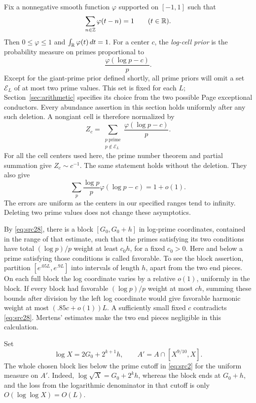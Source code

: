 Fix a nonnegative smooth function $\varphi$ supported on $[-1,1]$
such that
\[
 \sum_{n\in\mathbb Z}\varphi(t-n)=1\qquad(t\in\mathbb R).
\]
Then $0\le\varphi\le1$ and $\int_{\mathbb R}\varphi(t)\,dt=1$.
For a center $c$, the \emph{log-cell prior} is the probability measure
on primes proportional to
\[
                 \frac{\varphi(\log p-c)}p.
\]
Except for the giant-prime prior defined shortly, all prime priors
will omit a set $\mathcal E_L$ of at most two prime values.  This set
is fixed for each $L$; Section~\ref{sec:arithmetic} specifies its
choice from the two possible Page exceptional conductors.  Every
abundance assertion in this section holds uniformly after any such
deletion.  A nongiant cell is therefore normalized by
\[
 Z_c=\sum_{\substack{p\ \text{prime}\\p\notin\mathcal E_L}}
                 \frac{\varphi(\log p-c)}p.
\]
For all the cell centers used here, the prime number theorem and
partial summation give $Z_c\sim c^{-1}$.  The same statement holds
without the deletion.  They also give
\[
 \sum_p\frac{\log p}{p}\varphi(\log p-c)=1+o(1).
\]
The errors are uniform as the centers in our specified ranges tend
to infinity.  Deleting two prime values does not change these
asymptotics.

By \eqref{eq:src28}, there is a block $[G_0,G_0+h]$ in log-prime
coordinates, contained in the range of that estimate, such that the
primes satisfying its two conditions have total $(\log p)/p$ weight
at least $c_0h$, for a fixed $c_0>0$.  Here and below a prime satisfying
those conditions is called favorable.  To see the block assertion,
partition
$[e^{.05L},e^{.9L}]$ into intervals of length $h$, apart from the two
end pieces.  On each full block the log coordinate varies by a
relative $o(1)$, uniformly in the block.  If every block had favorable
$(\log p)/p$ weight at most $ch$, summing these bounds after division
by the left log coordinate would give favorable harmonic weight at
most $(.85c+o(1))L$.  A sufficiently small fixed $c$ contradicts
\eqref{eq:src28}.  Mertens' estimates make the two end pieces
negligible in this calculation.

Set
\[
                   \log X=2G_0+2^{k+1}h,
       \qquad A'=A\cap[X^{9/10},X].
\]
The whole chosen block lies below the prime cutoff in
\eqref{eq:src2} for the uniform measure on $A'$.  Indeed,
$\log\sqrt X=G_0+2^kh$, whereas the block ends at $G_0+h$, and the
loss from the logarithmic denominator in that cutoff is only
$O(\log\log X)=O(L)$.

